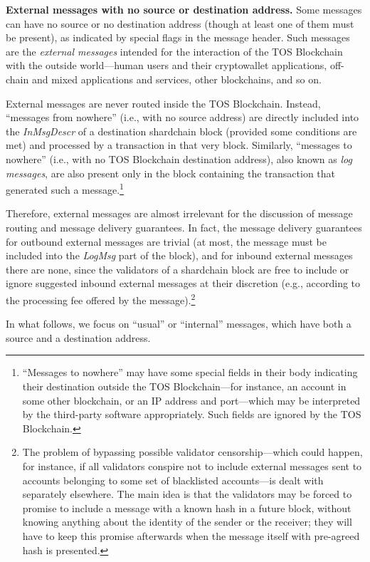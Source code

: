 \documentclass[12pt,oneside]{article}
\def\makepoint#1{\medbreak\noindent{\bf #1.\ }}
\def\nxsubpoint{\refstepcounter{subsubsection}%
  \smallbreak\makepoint{\thesubsubsection}}
\def\emb#1{\textbf{#1.}}
\begin{document}
\nxsubpoint\emb{External messages with no source or destination address}
Some messages can have no source or no destination address (though at least one of them must be present), as indicated by special flags in the message header. Such messages are the {\em external messages} intended for the interaction of the TOS Blockchain with the outside world---human users and their cryptowallet applications, off-chain and mixed applications and services, other blockchains, and so on.

External messages are never routed inside the TOS Blockchain. Instead, ``messages from nowhere'' (i.e., with no source address) are directly included into the \textit{InMsgDescr\/} of a destination shardchain block (provided some conditions are met) and processed by a transaction in that very block. Similarly, ``messages to nowhere'' (i.e., with no TOS Blockchain destination address), also known as {\em log messages}, are also present only in the block containing the transaction that generated such a message.\footnote{``Messages to nowhere'' may have some special fields in their body indicating their destination outside the TOS Blockchain---for instance, an account in some other blockchain, or an IP address and port---which may be interpreted by the third-party software appropriately. Such fields are ignored by the TOS Blockchain.}

Therefore, external messages are almost irrelevant for the discussion of message routing and message delivery guarantees. In fact, the message delivery guarantees for outbound external messages are trivial (at most, the message must be included into the \textit{LogMsg} part of the block), and for inbound external messages there are none, since the validators of a shardchain block are free to include or ignore suggested inbound external messages at their discretion (e.g., according to the processing fee offered by the message).\footnote{The problem of bypassing possible validator censorship---which could happen, for instance, if all validators conspire not to include external messages sent to accounts belonging to some set of blacklisted accounts---is dealt with separately elsewhere. The main idea is that the validators may be forced to promise to include a message with a known hash in a future block, without knowing anything about the identity of the sender or the receiver; they will have to keep this promise afterwards when the message itself with pre-agreed hash is presented.}

In what follows, we focus on ``usual'' or ``internal'' messages, which have both a source and a destination address.
\end{document}
